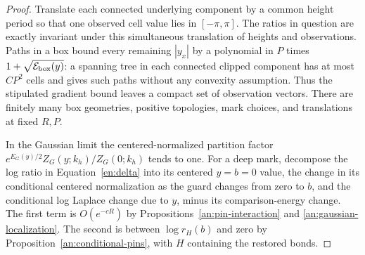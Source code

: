 \begin{proof}
Translate each connected underlying component by a common height
period so that one observed cell value lies in $[-\pi,\pi]$.
The ratios in question are exactly invariant under this simultaneous
translation of heights and observations.  Paths in a box bound every
remaining $|y_x|$ by a polynomial in $P$ times
$1+\sqrt{\mathcal E_{\rm box}(y)}$: a spanning tree in each
connected clipped component has at most $CP^2$ cells and gives such
paths without any convexity assumption.  Thus the stipulated gradient
bound leaves a compact set of observation vectors.  There are finitely
many box geometries, positive topologies, mark choices, and translations
at fixed $R,P$.

In the Gaussian limit the centered-normalized partition factor
$e^{E_G(y)/2}Z_G(y;k_h)/Z_G(0;k_h)$ tends to one.  For a deep mark,
decompose the log ratio in Equation~\eqref{en:delta} into its centered
$y=b=0$ value, the change in its conditional centered normalization
as the guard changes from zero to $b$, and the conditional log Laplace
change due to $y$, minus its comparison-energy change.  The first
term is $O(e^{-cR})$ by Propositions~\ref{an:pin-interaction} and
\ref{an:gaussian-localization}.  The second is between
$\log r_H(b)$ and zero by
Proposition~\ref{an:conditional-pins}, with $H$ containing the restored
bonds.


\end{proof}
